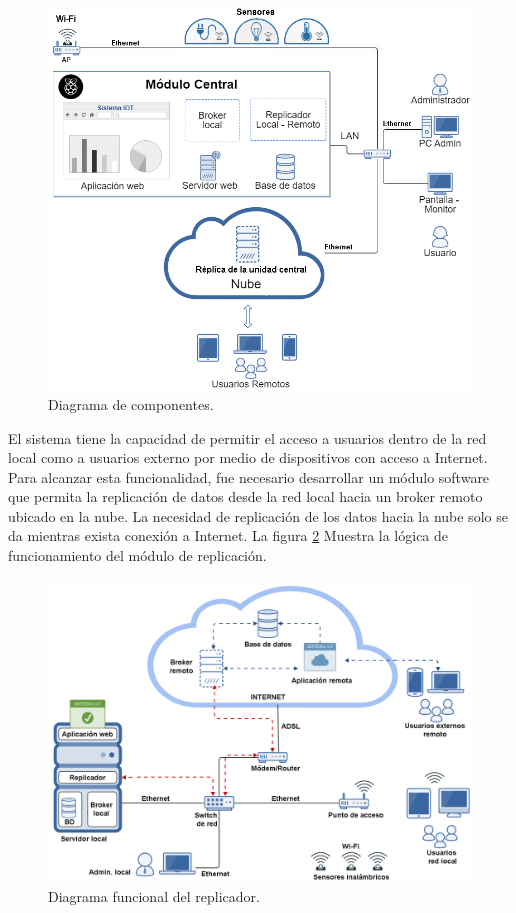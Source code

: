 \begin{figure}[htbp]
	\centering
	\includegraphics[width=1.0\textwidth]{./Figures/diagrama1.png}
	\caption{Diagrama de componentes.}

	\label{fig:diagrama1}
\end{figure}

El sistema tiene la capacidad de permitir el acceso a usuarios dentro de la red local como a usuarios externo por medio de dispositivos con acceso a Internet. Para alcanzar esta funcionalidad, fue necesario desarrollar un módulo software que permita la replicación de datos desde la red local hacia un broker remoto ubicado en la nube. La necesidad de replicación de los datos hacia la nube solo se da mientras exista conexión a Internet. La figura \ref{fig:diagrama2}  Muestra la lógica de funcionamiento del módulo de replicación.


\begin{figure}[htbp]
	\centering
	\includegraphics[width=1.0\textwidth]{./Figures/diagrama2.png}
	\caption{Diagrama funcional del replicador. }

	\label{fig:diagrama2}
\end{figure}


